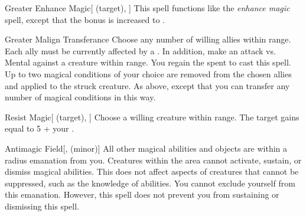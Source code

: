 \lowercase{\hypertarget{spell:Greater Enhance Magic}{}}\label{spell:Greater Enhance Magic}
\begin{attuneability}[\nth{4}]{\hypertarget{spell:Greater Enhance Magic}{Greater Enhance Magic}}[ (target), ]
This spell functions like the \textit{enhance magic} spell, except that the bonus is increased to .
\end{attuneability}
\vspace{0.25em}



\lowercase{\hypertarget{spell:Greater Malign Transferance}{}}\label{spell:Greater Malign Transferance}
\begin{apability}[\nth{5}]{\hypertarget{spell:Greater Malign Transferance}{Greater Malign Transferance}}
Choose any number of willing allies within \rngmed range.
Each ally must be currently affected by a  .
In addition, make an attack vs. Mental against a creature within \rngmed range.
\miss You regain the  spent to cast this spell.
\hit Up to two magical conditions of your choice are removed from the chosen allies and applied to the struck creature.
\crit As above, except that you can transfer any number of magical conditions in this way.
\end{apability}
\vspace{0.25em}



\lowercase{\hypertarget{spell:Resist Magic}{}}\label{spell:Resist Magic}
\begin{attuneability}[\nth{5}]{\hypertarget{spell:Resist Magic}{Resist Magic}}[ (target), ]
Choose a willing creature within \rngmed range.
The target gains  equal to 5 + your .
\end{attuneability}
\vspace{0.25em}



\lowercase{\hypertarget{spell:Antimagic Field}{}}\label{spell:Antimagic Field}
\begin{apability}[\nth{7}]{\hypertarget{spell:Antimagic Field}{Antimagic Field}}[,  (minor)]
All other magical abilities and objects are  within a \areamed radius emanation from you.
Creatures within the area cannot activate, sustain, or dismiss magical abilities.
This does not affect aspects of creatures that cannot be suppressed, such as the knowledge of abilities.
You cannot exclude yourself from this emanation.
However, this spell does not prevent you from sustaining or dismissing this spell.
\end{apability}
\vspace{0.25em}



